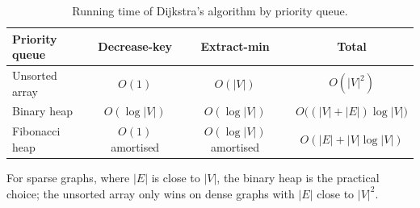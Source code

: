 \documentclass[11pt,a4paper]{article}   %
\begin{document}
\begin{table}[ht]
  \centering
  \caption{Running time of Dijkstra's algorithm by priority queue.}
  \label{tab:queues}
  \begin{tabular}{lccc}
    \toprule
    Priority queue & Decrease-key & Extract-min & Total \\
    \midrule
    Unsorted array & $O(1)$ & $O(|V|)$ & $O(|V|^2)$ \\
    Binary heap & $O(\log |V|)$ & $O(\log |V|)$ & $O\bigl((|V| + |E|) \log |V|\bigr)$ \\
    Fibonacci heap & $O(1)$ amortised & $O(\log |V|)$ amortised & $O(|E| + |V| \log |V|)$ \\
    \bottomrule
  \end{tabular}
\end{table}

For sparse graphs, where $|E|$ is close to $|V|$, the binary heap is the practical choice; the
unsorted array only wins on dense graphs with $|E|$ close to $|V|^2$.

\printbibliography
\end{document}
